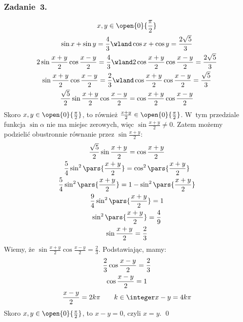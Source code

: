 \subsubsection*{Zadanie~3.}
\begin{gather*}
    x, y \in \open{0}{\frac{\pi}{2}}\\
    \sin x + \sin y = \frac{4}{3} \wland \cos x + \cos y = \frac{2\sqrt{5}}{3}\\
    2\sin\frac{x + y}{2}\cos\frac{x - y}{2} = \frac{4}{3} \wland 2\cos\frac{x + y}{2}\cos\frac{x - y}{2} = \frac{2\sqrt{5}}{3}\\
    \sin\frac{x + y}{2}\cos\frac{x - y}{2} = \frac{2}{3} \wland \cos\frac{x + y}{2}\cos\frac{x - y}{2} = \frac{\sqrt{5}}{3}\\
    \frac{\sqrt{5}}{2}\sin\frac{x + y}{2}\cos\frac{x - y}{2} = \cos\frac{x + y}{2}\cos\frac{x - y}{2}
\end{gather*}
Skoro \(x, y \in \open{0}{\frac{\pi}{2}}\), to również \(\frac{x + y}{2} \in \open{0}{\frac{\pi}{2}}\). W~tym przedziale funkcja \(\sin\alpha\) nie ma miejsc zerowych, więc \(\sin\frac{x + y}{2} \neq 0\). Zatem możemy podzielić obustronnie równanie przez \(\sin\frac{x + y}{2}\):
\begin{gather*}
    \frac{\sqrt{5}}{2}\sin\frac{x + y}{2} = \cos\frac{x + y}{2}\\
    \frac{5}{4}\sin^2\pars{\frac{x + y}{2}} = \cos^2\pars{\frac{x + y}{2}}\\
    \frac{5}{4}\sin^2\pars{\frac{x + y}{2}} = 1 - \sin^2\pars{\frac{x + y}{2}}\\
    \frac{9}{4}\sin^2\pars{\frac{x + y}{2}} = 1\\
    \sin^2\pars{\frac{x + y}{2}} = \frac{4}{9}\\
    \sin\frac{x + y}{2} = \frac{2}{3}
\end{gather*}
Wiemy, że \(\sin\frac{x + y}{2}\cos\frac{x - y}{2} = \frac{2}{3}\). Podstawiając, mamy:
\begin{gather*}
    \frac{2}{3}\cos\frac{x - y}{2} = \frac{2}{3}\\
    \cos\frac{x - y}{2} = 1\\
    \frac{x - y}{2} = 2k\pi \qquad k \in \integer
    x - y = 4k\pi
\end{gather*}
Skoro \(x, y \in \open{0}{\frac{\pi}{2}}\), to \(x - y = 0\), czyli \(x = y\).
\qed
